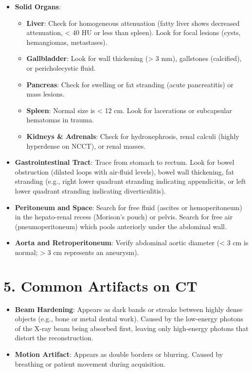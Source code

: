 \begin{itemize}
    \item \textbf{Solid Organs}:
    \begin{itemize}
        \item \textbf{Liver}: Check for homogeneous attenuation (fatty liver shows decreased attenuation, < 40 HU or less than spleen). Look for focal lesions (cysts, hemangiomas, metastases).
        \item \textbf{Gallbladder}: Look for wall thickening (> 3 mm), gallstones (calcified), or pericholecystic fluid.
        \item \textbf{Pancreas}: Check for swelling or fat stranding (acute pancreatitis) or mass lesions.
        \item \textbf{Spleen}: Normal size is < 12 cm. Look for lacerations or subcapsular hematomas in trauma.
        \item \textbf{Kidneys \& Adrenals}: Check for hydronephrosis, renal calculi (highly hyperdense on NCCT), or renal masses.
    \end{itemize}
    \item \textbf{Gastrointestinal Tract}: Trace from stomach to rectum. Look for bowel obstruction (dilated loops with air-fluid levels), bowel wall thickening, fat stranding (e.g., right lower quadrant stranding indicating appendicitis, or left lower quadrant stranding indicating diverticulitis).
    \item \textbf{Peritoneum and Space}: Search for free fluid (ascites or hemoperitoneum) in the hepato-renal recess (Morison's pouch) or pelvis. Search for free air (pneumoperitoneum) which pools anteriorly under the abdominal wall.
    \item \textbf{Aorta and Retroperitoneum}: Verify abdominal aortic diameter (< 3 cm is normal; > 3 cm represents an aneurysm).
\end{itemize}


\section*{5. Common Artifacts on CT}
\begin{itemize}
    \item \textbf{Beam Hardening}: Appears as dark bands or streaks between highly dense objects (e.g., bone or metal dental work). Caused by the low-energy photons of the X-ray beam being absorbed first, leaving only high-energy photons that distort the reconstruction.
    \item \textbf{Motion Artifact}: Appears as double borders or blurring. Caused by breathing or patient movement during acquisition.
\end{itemize}


